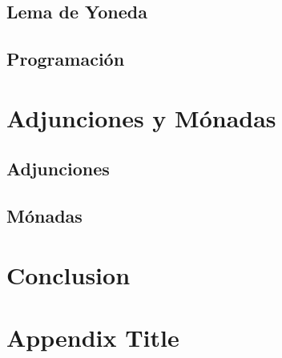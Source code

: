 \documentclass[11pt]{book}
\begin{document}
\section{Lema de Yoneda}

\section{Programación}

\chapter{Adjunciones y Mónadas}
\section{Adjunciones}


\section{Mónadas}


\chapter{Conclusion}

\printbibliography

\appendix
\chapter{Appendix Title}
\end{document}
